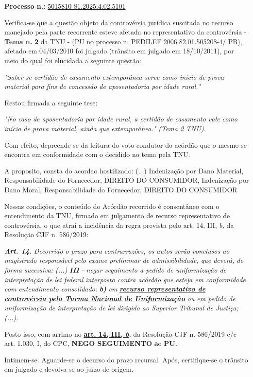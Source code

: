 \documentclass[12pt]{article}
\begin{document}
\justifying
\noindent \textbf{Processo n.: }\uline{5015810-81.2025.4.02.5101}

\noindent Verifica-se que a questão objeto da controvérsia jurídica suscitada no recurso manejado pela parte recorrente esteve afetada no representativo da controvérsia - \textbf{Tema n. }\textbf{2} da TNU - (PU no processo n. PEDILEF 2006.82.01.505208-4/ PB),  afetado em 04/03/2010 foi julgado (trânsito em julgado em 18/10/2011), por meio do qual foi elucidada a seguinte questão:

{\leftskip=3.1cm\rightskip=0.8cm\parindent=0pt \textit{"Saber se certidão de casamento extemporânea serve como início de prova material para fins de concessão de aposentadoria por idade rural."}\par}

\noindent Restou firmada a seguinte tese:

{\leftskip=3.1cm\rightskip=0.8cm\parindent=0pt \textit{"No caso de aposentadoria por idade rural, a certidão de casamento vale como início de prova material, ainda que extemporânea." (Tema 2 TNU).}\par}

\noindent Com efeito, depreende-se da leitura do voto condutor do acórdão que o mesmo se encontra em conformidade com o decidido no  tema pela TNU.

\noindent A proposito, consta do acordao hostilizado: (...) Indenização por Dano Material, Responsabilidade do Fornecedor, DIREITO DO CONSUMIDOR, Indenização por Dano Moral, Responsabilidade do Fornecedor, DIREITO DO CONSUMIDOR

\noindent Nessas condições, o conteúdo do Acórdão recorrido é consentâneo com o entendimento da TNU, firmado em julgamento de recurso representativo de controvérsia, o que atrai a incidência da regra prevista pelo art. 14, III, \textit{b,} da Resolução CJF n. 586/2019:

\noindent \textit{\textbf{Art. 14.}}\textit{ Decorrido o prazo para contrarrazões, os autos serão conclusos ao magistrado responsável pelo exame preliminar de admissibilidade, que deverá, de forma sucessiva: (...) }\textit{\textbf{III }}\textit{- negar seguimento a pedido de uniformização de interpretação de lei federal interposto contra acórdão que esteja em conformidade com entendimento consolidado: }\textit{\textbf{b)}}\textit{ em }\textit{\textbf{\uline{recurso representativo de controvérsia pela Turma Nacional de Uniformização}}}\textit{ ou em pedido de uniformização de interpretação de lei dirigido ao Superior Tribunal de Justiça;(...).}

\noindent Posto isso, com arrimo no \textbf{\uline{art. 14, III, }}\textit{\textbf{\uline{b}}}\textit{,} da Resolução CJF n. 586/2019 c/c art. 1.030, I, do CPC, \textbf{NEGO SEGUIMENTO }\textbf{a}o\textbf{ PU}\textbf{.}

\noindent Intimem-se. Aguarde-se o decurso do prazo recursal. Após, certifique-se o trânsito em julgado e devolva-se ao juízo de origem.
\end{document}
